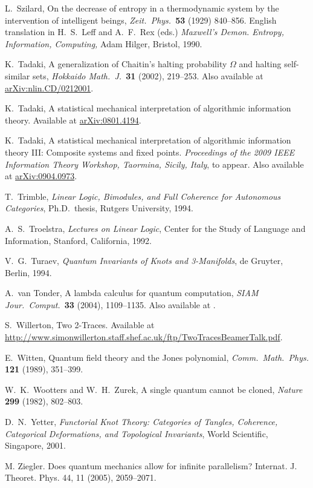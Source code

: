\documentclass[12pt,twoside,openright]{report}
\begin{document}
\begin{thebibliography}{99}
 L.\ Szilard, On the decrease of entropy in a thermodynamic system by the intervention of intelligent beings,
\textsl{Zeit.\ Phys.\ }\textbf{53} (1929) 840--856. English translation in H.\ S.\ Leff and A.\ F.\ Rex (eds.)
\textit{Maxwell's Demon. Entropy, Information, Computing,} 
Adam Hilger, Bristol, 1990.

 K.\ Tadaki, A generalization of Chaitin's halting probability $\Omega$ and halting self-similar sets, {\sl Hokkaido Math.\ J.\ }\textbf{31} (2002), 219--253.  Also available at
\href{http://arxiv.org/abs/nlin.CD/0212001}{arXiv:nlin.CD/0212001}.

 K.\ Tadaki, A statistical mechanical interpretation of algorithmic information theory.  Available at
\href{http://arxiv.org/abs/0801.4194}{arXiv:0801.4194}.

 K.\ Tadaki, A statistical mechanical interpretation of algorithmic information theory III: Composite systems and fixed points.
\textsl{Proceedings of the 2009 IEEE Information Theory Workshop, Taormina, Sicily, Italy}, to appear.  Also available at
\href{http://arxiv.org/abs/0904.0973}{arXiv:0904.0973}.

 T.\ Trimble, {\sl Linear Logic, Bimodules, and Full Coherence for Autonomous Categories}, Ph.D.\ thesis, Rutgers University, 
1994. 

 A.\ S.\ Troelstra, {\sl Lectures on Linear Logic}, Center for the Study of Language and Information, Stanford, California,
1992.

 V.\ G.\ Turaev, {\sl Quantum Invariants of Knots and 3-Manifolds}, de Gruyter, Berlin, 1994.

 A.\ van Tonder, A lambda calculus for quantum computation,
{\sl SIAM Jour.\ Comput.\ }{\bf 33} (2004), 1109--1135. Also available at .

 S.\ Willerton, Two 2-Traces.  Available at \\ \href{http://www.simonwillerton.staff.shef.ac.uk/ftp/TwoTracesBeamerTalk.pdf}{http://www.simonwillerton.staff.shef.ac.uk/ftp/TwoTracesBeamerTalk.pdf}.

 E.\ Witten, Quantum field theory and the Jones polynomial,
\textsl{Comm.\ Math.\ Phys.} \textbf{121} (1989), 351--399.

 W.\ K.\ Wootters and W.\ H.\ Zurek, A single quantum cannot be cloned, {\sl Nature} {\bf 299} 
(1982), 802--803. 

 D.\ N.\ Yetter, {\sl Functorial Knot Theory: Categories of Tangles, Coherence, Categorical Deformations, and Topological Invariants}, World Scientific, Singapore, 2001.

  M. Ziegler. Does quantum mechanics allow for infinite parallelism?  Internat. J. Theoret. Phys.  44, 11 (2005), 2059--2071.

\end{thebibliography}
\end{document}
